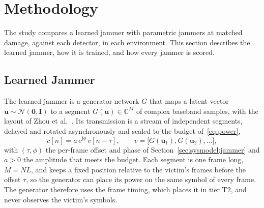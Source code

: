 \section{Methodology} \label{sec:method}

The study compares a learned jammer with parametric jammers at matched damage, against each detector, in each environment.
This section describes the learned jammer, how it is trained, and how every jammer is scored.

\subsection{Learned Jammer} \label{sec:method:generator}
The learned jammer is a generator network $G$ that maps a latent vector $\mathbf{u}\sim\mathcal{N}(\mathbf{0},\mathbf{I})$ to a segment $G(\mathbf{u})\in\mathbb{C}^{M}$ of complex baseband samples, with the layout of Zhou et al.~\cite{11184988}.
Its transmission is a stream of independent segments, delayed and rotated asynchronously and scaled to the budget of~\eqref{eq:power},
\begin{equation*}
c[n]=a\,e^{\mathrm{j}\phi}\,v[n-\tau],\qquad v=\bigl[G(\mathbf{u}_1),G(\mathbf{u}_2),\ldots\bigr],
\end{equation*}
with $(\tau,\phi)$ the per-frame offset and phase of Section~\ref{sec:sysmodel:jammer} and $a>0$ the amplitude that meets the budget.
Each segment is one frame long, $M=NL$, and keeps a fixed position relative to the victim's frames before the offset $\tau$, so the generator can place its power on the same symbol of every frame.
The generator therefore uses the frame timing, which places it in tier T2, and never observes the victim's symbols.

